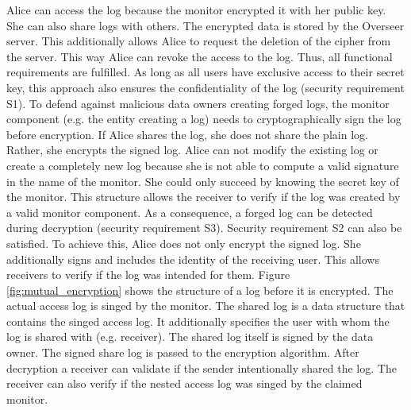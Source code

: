 \documentclass[../main.txt]{subfiles}
\begin{document}
Alice can access the log because the monitor encrypted it with her public key.
She can also share logs with others.
The encrypted data is stored by the Overseer server.
This additionally allows Alice to request the deletion of the cipher from the server.
This way Alice can revoke the access to the log.
Thus, all functional requirements are fulfilled.
As long as all users have exclusive access to their secret key, this approach also ensures the confidentiality of the log (security requirement S1).
To defend against malicious data owners creating forged logs, the monitor component (e.g. the entity creating a log) needs to cryptographically sign the log before encryption.
If Alice shares the log, she does not share the plain log.
Rather, she encrypts the signed log.
Alice can not modify the existing log or create a completely new log because she is not able to compute a valid signature in the name of the monitor.
She could only succeed by knowing the secret key of the monitor.
This structure allows the receiver to verify if the log was created by a valid monitor component.
As a consequence, a forged log can be detected during decryption (security requirement S3).
Security requirement S2 can also be satisfied.
To achieve this, Alice does not only encrypt the signed log.
She additionally signs and includes the identity of the receiving user.
This allows receivers to verify if the log was intended for them.
Figure \ref{fig:mutual_encryption} shows the structure of a log before it is encrypted.
The actual access log is singed by the monitor.
The shared log is a data structure that contains the singed access log.
It additionally specifies the user with whom the log is shared with (e.g. receiver).
The shared log itself is signed by the data owner.
The signed share log is passed to the encryption algorithm.
After decryption a receiver can validate if the sender intentionally shared the log.
The receiver can also verify if the nested access log was singed by the claimed monitor.
\end{document}
